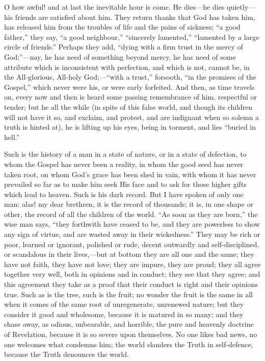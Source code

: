 O how awful! and at last the inevitable hour is come. He dies—he
dies quietly—his friends are satisfied about him. They return thanks
that God has taken him, has released him from the troubles of life and
the pains of sickness; ``a good father,'' they say, ``a
good neighbour,'' ``sincerely lamented,'' ``lamented
by a large circle of friends.'' Perhaps they add, ``dying with
a firm trust in the mercy of God;''—nay, he has need of
something beyond mercy, he has need of some attribute which is
inconsistent with perfection, and which is not, cannot be, in the
All-glorious, All-holy God;—``with a trust,'' forsooth,
``in the promises of the Gospel,'' which never were his, or
were early forfeited. And then, as time travels on, every now and then
is heard some passing remembrance of him, respectful or tender; but he
all the while (in spite of this false world, and though its children
will not have it so, and exclaim, and protest, and are indignant when
so solemn a truth is hinted at), he is lifting up his eyes, being in
torment, and lies ``buried in hell.''

Such is the history of a man in a state of nature, or in a state of
defection, to whom the Gospel has never been a reality, in whom the
good seed has never taken root, on whom God's grace has been shed in
vain, with whom it has never prevailed so far as to make him seek His
face and to ask for those higher gifts which lead to heaven. Such is
his dark record. But I have spoken of only one man: alas! my dear
brethren, it is the record of thousands; it is, in one shape or other,
the record of all the children of the world. ``As soon as they are
born,'' the wise man says, ``they forthwith have ceased to be,
and they are powerless to show any sign of virtue, and are wasted away
in their wickedness.'' They may be rich or poor, learned or
ignorant, polished or rude, decent outwardly and self-disciplined, or
scandalous in their lives,—but at bottom they are all one and the
same; they have not faith, they have not love; they are impure, they
are proud; they all agree together very well, both in opinions and in
conduct; they see that they agree; and this agreement they take as a
proof that their conduct is right and their opinions true. Such as is
the tree, such is the fruit; no wonder the fruit is the same in all
when it comes of the same root of unregenerate, unrenewed nature; but
they consider it good and wholesome, because it is matured in so many;
and they chase away, as odious, unbearable, and horrible, the pure and
heavenly doctrine of Revelation, because it is so severe upon
themselves. No one likes bad news, no one welcomes what condemns him;
the world slanders the Truth in self-defence, because the Truth
denounces the world.

